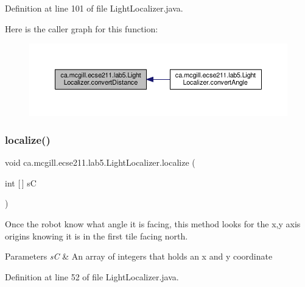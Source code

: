 Definition at line 101 of file Light\+Localizer.\+java.

Here is the caller graph for this function\+:\nopagebreak
\begin{figure}[H]
\begin{center}
\leavevmode
\includegraphics[width=350pt]{classca_1_1mcgill_1_1ecse211_1_1lab5_1_1_light_localizer_a9eebe889aa2d4d2e881f413cc727cd9c_icgraph}
\end{center}
\end{figure}
\mbox{\label{classca_1_1mcgill_1_1ecse211_1_1lab5_1_1_light_localizer_a441f56a899fae5bc9c1d6a6d25fbe0bb}} 
\subsubsection{\texorpdfstring{localize()}{localize()}}
{\footnotesize\ttfamily void ca.\+mcgill.\+ecse211.\+lab5.\+Light\+Localizer.\+localize (\begin{DoxyParamCaption}\item[{int \mbox{[}$\,$\mbox{]}}]{sC }\end{DoxyParamCaption})}

Once the robot know what angle it is facing, this method looks for the x,y axis origins knowing it is in the first tile facing north.


\begin{DoxyParams}{Parameters}
{\em sC} & An array of integers that holds an x and y coordinate \\
\hline
\end{DoxyParams}


Definition at line 52 of file Light\+Localizer.\+java.

